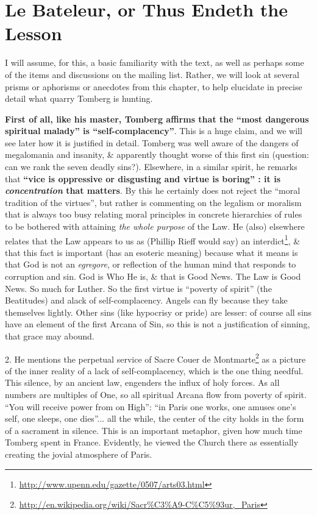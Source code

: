 \section{Le Bateleur, or Thus Endeth the Lesson}

I will assume, for this, a basic familiarity with the text, as well as perhaps some of the items and discussions on the mailing list. Rather, we will look at several prisms or aphorisms or anecdotes from this chapter, to help elucidate in precise detail what quarry Tomberg is hunting.

\textbf{First of all, like his master, Tomberg affirms that the ``most dangerous spiritual malady'' is ``self-complacency''}. This is a huge claim, and we will see later how it is justified in detail. Tomberg was well aware of the dangers of megalomania and insanity, \& apparently thought worse of this first sin (question: can we rank the seven deadly sins?). Elsewhere, in a similar spirit, he remarks that \textbf{``vice is oppressive or disgusting and virtue is boring'' : it is
\emph{concentration} that matters}. By this he certainly does not reject the ``moral tradition of the virtues'', but rather is commenting on the legalism or moralism that is always too busy relating moral principles in concrete hierarchies of rules to be bothered with attaining \emph{the whole purpose} of the Law. He (also) elsewhere relates that the Law appears to us as (Phillip Rieff would say) an interdict\footnote{\url{http://www.upenn.edu/gazette/0507/arts03.html}}, \& that this fact is important (has an esoteric meaning) because what it means is that God is not an \emph{egregore}, or reflection of the human mind that responds to corruption and sin. God is Who He is, \& that is Good News. The Law is Good News. So much for Luther. So the first virtue is ``poverty of spirit'' (the Beatitudes) and alack of self-complacency. Angels can fly because they take themselves lightly. Other sins (like hypocrisy or pride) are lesser: of course all sins have an element of the first Arcana of Sin, so this is not a justification of sinning, that grace may abound.

2. He mentions the perpetual service of Sacre Couer de Montmarte\footnote{\url{http://en.wikipedia.org/wiki/Sacr\%C3\%A9-C\%C5\%93ur,_Paris}} as a picture of the inner reality of a lack of self-complacency, which is the one thing needful. This silence, by an ancient law, engenders the influx of holy forces. As all numbers are multiples of One, so all spiritual Arcana flow from poverty of spirit. ``You will receive power from on High'': ``in Paris one works, one amuses one's self, one sleeps, one dies''... all the while, the center of the city holds in the form of a sacrament in silence. This is an important metaphor, given how much time Tomberg spent in France. Evidently, he viewed the Church there as essentially creating the jovial atmosphere of Paris.

